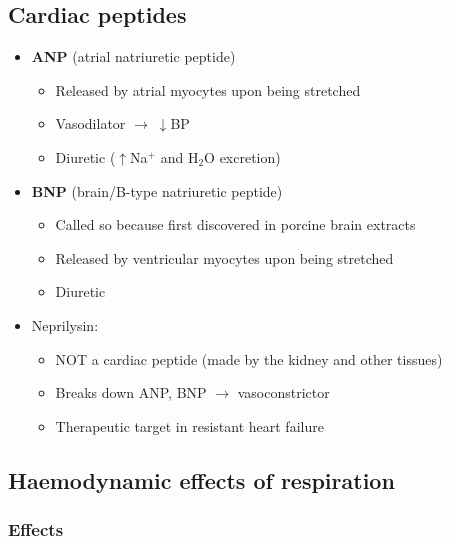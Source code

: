 \documentclass[
  12pt,
]{memoir}
\providecommand{\tightlist}{%
  \setlength{\itemsep}{0pt}\setlength{\parskip}{0pt}}
\begin{document}
\hypertarget{cardiac-peptides}{%
\subsection{Cardiac peptides}\label{cardiac-peptides}}

\begin{itemize}
\tightlist
\item
  \textbf{ANP} (atrial natriuretic peptide)

  \begin{itemize}
  \tightlist
  \item
    Released by atrial myocytes upon being stretched
  \item
    Vasodilator \(\rightarrow\;\downarrow\)BP
  \item
    Diuretic (\(\uparrow\)Na\(^+\) and H\(_2\)O excretion)
  \end{itemize}
\item
  \textbf{BNP} (brain/B-type natriuretic peptide)

  \begin{itemize}
  \tightlist
  \item
    Called so because first discovered in porcine brain extracts
  \item
    Released by ventricular myocytes upon being stretched
  \item
    Diuretic
  \end{itemize}
\item
  Neprilysin:

  \begin{itemize}
  \tightlist
  \item
    NOT a cardiac peptide (made by the kidney and other tissues)
  \item
    Breaks down ANP, BNP \(\rightarrow\) vasoconstrictor
  \item
    Therapeutic target in resistant heart failure
  \end{itemize}
\end{itemize}

\hypertarget{haemodynamic-effects-of-respiration}{%
\subsection{Haemodynamic effects of
respiration}\label{haemodynamic-effects-of-respiration}}

\hypertarget{effects}{%
\subsubsection{Effects}\label{effects}}
\end{document}
